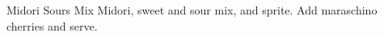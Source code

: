\documentclass[../cookbook.tex]{subfiles}
\begin{document}
\begin{recipe}{Midori Sours}{}{}
    Mix Midori, sweet and sour mix, and sprite. Add maraschino cherries and
    serve.

\end{recipe}
\end{document}

